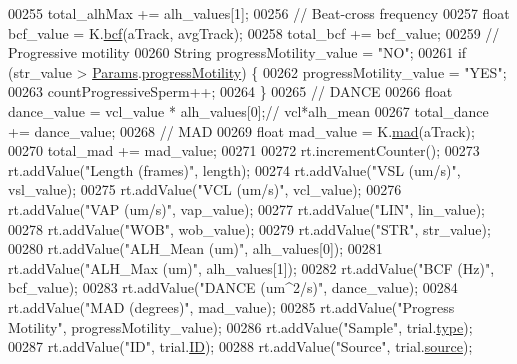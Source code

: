 \begin{DoxyCode}
{{{{00255       total\_alhMax += alh\_values[1];
00256       \textcolor{comment}{// Beat-cross frequency}
00257       \textcolor{keywordtype}{float} bcf\_value = K.\hyperlink{classfunctions_1_1_kinematics_ac35b9a912f923321eee5335c011f7c89}{bcf}(aTrack, avgTrack);
00258       total\_bcf += bcf\_value;
00259       \textcolor{comment}{// Progressive motility}
00260       String progressMotility\_value = \textcolor{stringliteral}{"NO"};
00261       \textcolor{keywordflow}{if} (str\_value > \hyperlink{classdata_1_1_params}{Params}.\hyperlink{classdata_1_1_params_ae9dd6b8ec81f8ae0b40a4e8e2d9cdc06}{progressMotility}) \{
00262         progressMotility\_value = \textcolor{stringliteral}{"YES"};
00263         countProgressiveSperm++;
00264       \}
00265       \textcolor{comment}{// DANCE}
00266       \textcolor{keywordtype}{float} dance\_value = vcl\_value * alh\_values[0];\textcolor{comment}{// vcl*alh\_mean}
00267       total\_dance += dance\_value;
00268       \textcolor{comment}{// MAD}
00269       \textcolor{keywordtype}{float} mad\_value = K.\hyperlink{classfunctions_1_1_kinematics_a2b60196aad8d0eecb1c3048e0163ebc3}{mad}(aTrack);
00270       total\_mad += mad\_value;
00271 
00272       rt.incrementCounter();
00273       rt.addValue(\textcolor{stringliteral}{"Length (frames)"}, length);
00274       rt.addValue(\textcolor{stringliteral}{"VSL (um/s)"}, vsl\_value);
00275       rt.addValue(\textcolor{stringliteral}{"VCL (um/s)"}, vcl\_value);
00276       rt.addValue(\textcolor{stringliteral}{"VAP (um/s)"}, vap\_value);
00277       rt.addValue(\textcolor{stringliteral}{"LIN"}, lin\_value);
00278       rt.addValue(\textcolor{stringliteral}{"WOB"}, wob\_value);
00279       rt.addValue(\textcolor{stringliteral}{"STR"}, str\_value);
00280       rt.addValue(\textcolor{stringliteral}{"ALH\_Mean (um)"}, alh\_values[0]);
00281       rt.addValue(\textcolor{stringliteral}{"ALH\_Max (um)"}, alh\_values[1]);
00282       rt.addValue(\textcolor{stringliteral}{"BCF (Hz)"}, bcf\_value);
00283       rt.addValue(\textcolor{stringliteral}{"DANCE (um^2/s)"}, dance\_value);
00284       rt.addValue(\textcolor{stringliteral}{"MAD (degrees)"}, mad\_value);
00285       rt.addValue(\textcolor{stringliteral}{"Progress Motility"}, progressMotility\_value);
00286       rt.addValue(\textcolor{stringliteral}{"Sample"}, trial.\hyperlink{classdata_1_1_trial_a0b86e44425dbe3c9d866aa273f87828a}{type});
00287       rt.addValue(\textcolor{stringliteral}{"ID"}, trial.\hyperlink{classdata_1_1_trial_a317298c3409575f71e43acd3f73ce295}{ID});
00288       rt.addValue(\textcolor{stringliteral}{"Source"}, trial.\hyperlink{classdata_1_1_trial_a00baeba9d13a88ce01098a02d1e570d5}{source});
}}}}
\end{DoxyCode}
